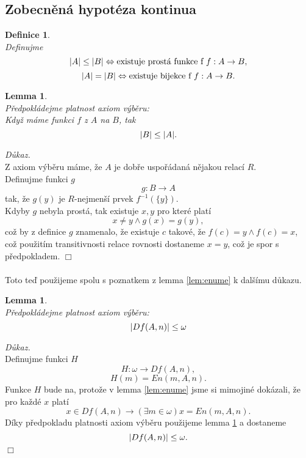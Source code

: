 \documentclass[12pt,a4paper]{article}
\newtheorem{lemma}[veta]{Lemma}
\newtheorem{definice}[veta]{Definice}
\newenvironment{proof}
{\noindent \textit{D\r{u}kaz.}}
{\hspace*{\fill} $\Box$}
\begin{document}
\subsection{Zobecn\v{e}n\'{a} hypot\'{e}za kontinua}
\begin{definice}~\\
\label{def:vel}
Definujme
\[ \arrowvert A \arrowvert \leq \arrowvert B \arrowvert \Leftrightarrow   \text{existuje prost\'{a} funkce f }  f:A  \rightarrow B, \]
\[ \arrowvert A \arrowvert = \arrowvert B \arrowvert \Leftrightarrow   \text{existuje bijekce f }  f:A  \rightarrow B .\]
\end{definice}
\begin{lemma}~\\
\label{lem:usp}
P\v{r}edpokl\'{a}dejme platnost axiom v\'{y}b\v{e}ru:\\
Kdy\v{z} m\'{a}me funkci $ f $ z $A$ na $B$, tak \[ \arrowvert B \arrowvert \leq \arrowvert A \arrowvert . \]
\end{lemma}
\begin{proof}~\\
Z axiom v\'{y}b\v{e}ru m\'{a}me, \v{z}e $A$ je dob\v{r}e uspo\v{r}\'{a}dan\'{a} n\v{e}jakou relac\'{i} $R$. \\
Definujme funkci $g$ \[  g:B \rightarrow A  \] tak, \v{z}e $g(y)$ je $R$-nejmen\v{s}\'{i} prvek $ f^{-1}(\{y\}) .$\\
Kdyby $g$ nebyla prost\'{a}, tak existuje $x,y$ pro kter\'{e} plat\'{i} \[ x \neq y \wedge g(x)=g(y),\]
co\v{z} by z definice $g$ znamenalo, \v{z}e existuje $c$ takov\'{e}, \v{z}e $ f(c)=y \wedge f(c)=x $, co\v{z} pou\v{z}it\'{i}m transitivnosti relace rovnosti dostaneme $x=y$, co\v{z} je spor s p\v{r}edpokladem. 
\end{proof} ~\\~\\
Toto te\v{d} pou\v{z}ijeme spolu s poznatkem z lemma \ref{lem:enume} k dal\v{s}\'{i}mu d\r{u}kazu.
\begin{lemma}
~\\
P\v{r}edpokl\'{a}dejme platnost axiom v\'{y}b\v{e}ru:\\
\[ \arrowvert Df(A,n)\arrowvert \leq \omega  \]
\label{lem:moh}
\end{lemma}
\begin{proof}~\\
Definujme funkci $ H $ \[ H:\omega \rightarrow Df(A,n) ,\]
\[ H(m)= En(m,A,n) .\]
Funkce $ H $ bude na, proto\v{z}e v lemma \ref{lem:enume} jsme si mimojin\'{e} dok\'{a}zali, \v{z}e pro ka\v{z}d\'{e} $ x $ plat\'{i} \[ x \in Df(A,n) \rightarrow (\exists m \in \omega) x = En(m,A,n) .\]
D\'{i}ky p\v{r}edpokladu platnosti axiom v\'{y}b\v{e}ru pou\v{z}ijeme lemma \ref{lem:usp} a dostaneme  
\[ \arrowvert Df(A,n)\arrowvert \leq \omega .\]
\end{proof}
\end{document}
